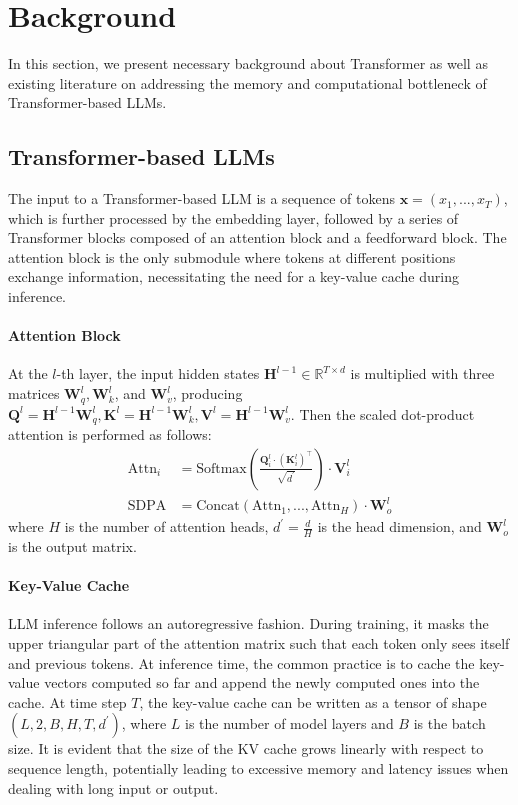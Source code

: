 \section{Background}
In this section, we present necessary background about Transformer as well as existing literature on addressing the memory and computational bottleneck of Transformer-based LLMs.

\subsection{Transformer-based LLMs}
The input to a Transformer-based LLM is a sequence of tokens 
$\bm{x}=(x_1,...,x_{T})$, which is further processed by the embedding layer, followed by a series of Transformer blocks composed of an attention block and a feedforward block. The attention block is the only submodule where tokens at different positions exchange information, necessitating the need for a key-value cache during inference.
\paragraph{Attention Block}
At the $l$-th layer, the input hidden states $\bm{H}^{l-1}\in \mathbb{R}^{T\times d}$ is multiplied with three matrices $\bm{W}_{q}^{l}, \bm{W}_{k}^{l}$, and $\bm{W}_{v}^{l}$, producing $\bm{Q}^{l}=\bm{H}^{l-1}\bm{W}_q^l, \bm{K}^{l}=\bm{H}^{l-1}\bm{W}_k^l, \bm{V}^{l}=\bm{H}^{l-1}\bm{W}_v^l$. Then the scaled dot-product attention is performed as follows:
\begin{align}
    \text{Attn}_i&=\text{Softmax}(\frac{\bm{Q}^{l}_{i}\cdot (\bm{K}_{i}^{l})^{\top}}{\sqrt{d^\prime}})\cdot \bm{V}_{i}^{l} \\
    \text{SDPA}&=\text{Concat}(\text{Attn}_1,...,\text{Attn}_{H})\cdot \bm{W}_{o}^{l}
\end{align}
where $H$ is the number of attention heads, $d^\prime=\frac{d}{H}$ is the head dimension, and $\bm{W}_o^l$ is the output matrix.
\paragraph{Key-Value Cache}
LLM inference follows an autoregressive fashion. During training, it masks the upper triangular part of the attention matrix such that each token only sees itself and previous tokens. At inference time, 
the common practice is to cache the key-value vectors computed so far and append the newly computed ones into the cache. At time step $T$, the key-value cache can be written as a tensor of shape $(L, 2, B, H, T, d^\prime)$, where $L$ is the number of model layers and $B$ is the batch size. 
It is evident that the size of the KV cache grows linearly with respect to sequence length, potentially leading to excessive memory and latency issues when dealing with long input or output.


